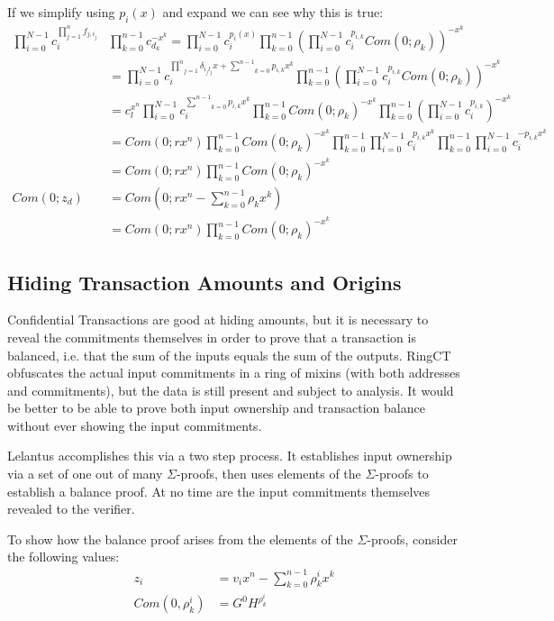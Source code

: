 \documentclass{article}
\newcommand\underoverset[3]{\underset{#1}{\overset{#2}{#3}}}
\begin{document}
If we simplify using $p_i(x)$ and expand we can see why this is true:
\begin{align}
  \prod_{i=0}^{N-1}{c_i^{\prod_{j=1}^{n}{f_{j,i_j}}}} &  \prod_{k=0}^{n-1}{c_{d_k}^{-x^k}} = \prod_{i=0}^{N-1}{c_i^{p_i(x)}} \prod_{k=0}^{n-1}{(\prod_{i=0}^{N-1}{c_i^{p_{i,k}}} Com(0; \rho_k))^{-x^k}}\\
      &= \prod_{i=0}^{N-1}{c_i^{  \underoverset{j=1}{n}{\prod}{\delta_{i_jl_j} x} + \underoverset{k=0}{n-1}{\sum}{p_{i,k} x^k}   }} \prod_{k=0}^{n-1}{(\prod_{i=0}^{N-1}{c_i^{p_{i,k}}} Com(0; \rho_k))^{-x^k}}\\
      &= c_l^{x^n} \prod_{i=0}^{N-1}{c_i^{ \underoverset{k=0}{n-1}{\sum}{p_{i,k} x^k} }}        \prod_{k=0}^{n-1}{ Com(0; \rho_k)^{-x^k}}         \prod_{k=0}^{n-1}{(\prod_{i=0}^{N-1}{c_i^{p_{i,k}}})^{-x^k}}\\
      &= Com(0; r x^n) \prod_{k=0}^{n-1}{ Com(0; \rho_k)^{-x^k}}      \prod_{k=0}^{n-1}{\prod_{i=0}^{N-1}{c_i^{p_{i,k}  x^k}}}          \prod_{k=0}^{n-1}{\prod_{i=0}^{N-1}{c_i^{-p_{i,k} x^k}}}\\
      &= Com(0; r x^n) \prod_{k=0}^{n-1}{ Com(0; \rho_k)^{-x^k}}\\
  Com(0; z_d) &= Com(0; rx^n - \sum_{k=0}^{n-1}{\rho_k x^k})\\
      &= Com(0; rx^n) \prod_{k=0}^{n-1}{Com(0; \rho_k)^{-x^k}}
\end{align}


\subsection{Hiding Transaction Amounts and Origins}
 
Confidential Transactions are good at hiding amounts, but it is necessary to reveal the commitments themselves in order to prove that a transaction is balanced, i.e. that the sum of the inputs equals the sum of the outputs.  RingCT obfuscates the actual input commitments in a ring of mixins (with both addresses and commitments), but the data is still present and subject to analysis.  It would be better to be able to prove both input ownership and transaction balance without ever showing the input commitments.

Lelantus accomplishes this via a two step process.  It establishes input ownership via a set of one out of many $\Sigma$-proofs, then uses elements of the $\Sigma$-proofs to establish a balance proof.  At no time are the input commitments themselves revealed to the verifier.

To show how the balance proof arises from the elements of the $\Sigma$-proofs, consider the following values:
\begin{align}
  z_i &= v_i x^n - \sum_{k=0}^{n-1}{\rho_k^i x^k}\\
  Com(0, \rho_k^i) &= G^0 H^{\rho_k^i}
\end{align}
\end{document}
